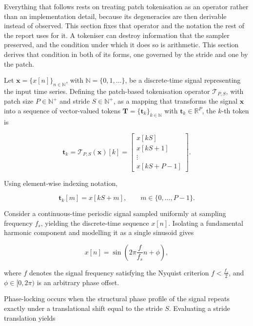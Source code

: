 Everything that follows rests on treating patch tokenisation as an operator rather than an implementation detail, because its degeneracies are then derivable instead of observed. This section fixes that operator and the notation the rest of the report uses for it. A tokeniser can destroy information that the sampler preserved, and the condition under which it does so is arithmetic. This section derives that condition in both of its forms, one governed by the stride and one by the patch.

Let $\mathbf{x} = \{x[n]\}_{n \in \mathbb{N}}$, with $\mathbb{N}=\{0,1,\ldots\}$, be a discrete-time signal representing the input time series. Defining the patch-based tokenisation operator $\mathcal{T}_{P,S}$, with patch size $P \in \mathbb{N}^{+}$ and stride $S \in \mathbb{N}^{+}$, as a mapping that transforms the signal $\mathbf{x}$ into a sequence of vector-valued tokens $\mathbf{T}=\{\mathbf{t}_k\}_{k\in\mathbb{N}}$ with $\mathbf{t}_k\in\mathbb{R}^{P}$, the $k$-th token is

\begin{equation*}
\mathbf{t}_k
=
\mathcal{T}_{P,S}(\mathbf{x})[k]
=
\begin{bmatrix}
x[kS] \\
x[kS+1] \\
\vdots \\
x[kS+P-1]
\end{bmatrix}.
\end{equation*}

Using element-wise indexing notation,

\begin{equation}
\label{eq:element_def}
\mathbf{t}_k[m]
=
x[kS+m],
\qquad
m\in\{0,\ldots,P-1\}.
\end{equation}

Consider a continuous-time periodic signal sampled uniformly at sampling frequency $f_s$, yielding the discrete-time sequence $x[n]$. Isolating a fundamental harmonic component and modelling it as a single sinusoid gives

\begin{equation*}
x[n]
=
\sin\!\left(
2\pi\frac{f}{f_s}n+\phi
\right),
\end{equation*}

where $f$ denotes the signal frequency satisfying the Nyquist criterion $f < \frac{f_s}{2}$, and $\phi\in[0,2\pi)$ is an arbitrary phase offset.

Phase-locking occurs when the structural phase profile of the signal repeats exactly under a translational shift equal to the stride $S$. Evaluating a stride translation yields

